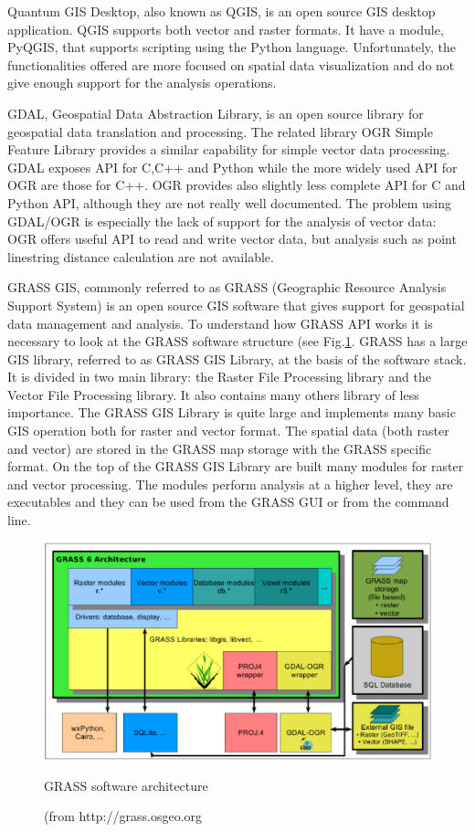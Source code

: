 \documentclass[12pt,a4paper,twoside]{book}
\begin{document}
Quantum GIS Desktop, also known as QGIS, is an open source GIS desktop application. QGIS supports both vector and raster formats. It have a module, PyQGIS, that supports scripting using the Python language. Unfortunately, the functionalities offered are more focused on spatial data visualization and do not give enough support for the analysis operations.

GDAL, Geospatial Data Abstraction Library, is an open source library for geospatial data translation and processing. The related library OGR Simple Feature Library provides a similar capability for simple vector data processing. GDAL exposes API for C,C++ and Python while the more widely used API for OGR are those for C++. OGR provides also slightly less complete API for C and Python API, although they are not really well documented. The problem using GDAL/OGR is especially the lack of support for the analysis of vector data: OGR offers useful API to read and write vector data, but analysis such as point linestring distance calculation are not available.

GRASS GIS, commonly referred to as GRASS (Geographic Resource Analysis Support System) is an open source GIS software that gives support for geospatial data management and analysis. To understand how GRASS API works it is necessary to look at the GRASS software structure (see Fig.\ref{grass_structure}. GRASS has a large GIS library, referred to as GRASS GIS Library, at the basis of the software stack. It is divided in two main library: the Raster File Processing library and the Vector File Processing library. It also contains many others library of less importance. The GRASS GIS Library is quite large and implements many basic GIS operation both for raster and vector format. The spatial data (both raster and vector) are stored in the GRASS map storage with the GRASS specific format. On the top of the GRASS GIS Library are built many modules for raster and vector processing. The modules perform analysis at a higher level, they are executables and they can be used from the GRASS GUI or from the command line.

\begin{figure}[!ht]
  \begin{center}
    \includegraphics[width=\textwidth]{images/grass6_arch.eps}
    \caption{(from http://grass.osgeo.org} GRASS software architecture\label{grass_structure}
  \end{center}
\end{figure}
\end{document}
